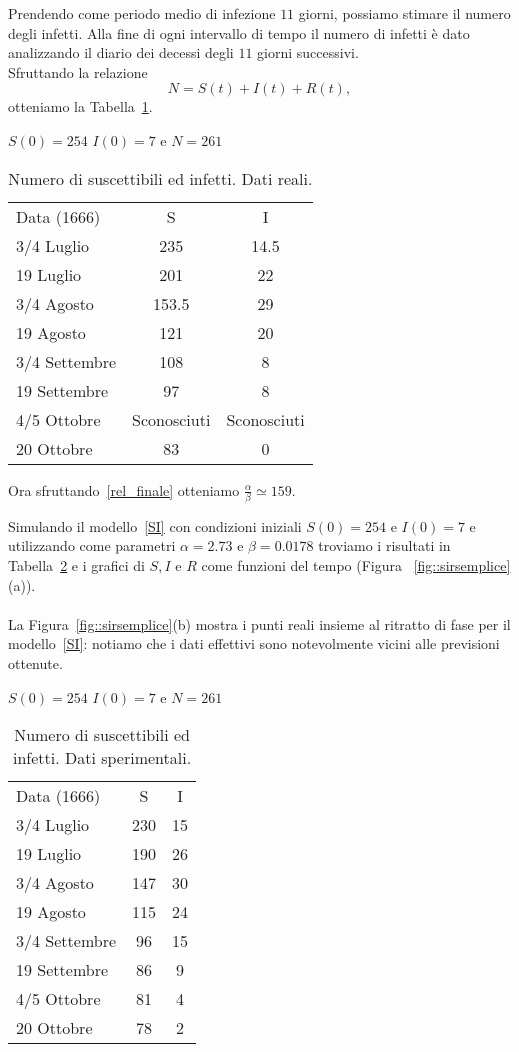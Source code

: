 Prendendo come periodo medio di infezione  $11$ giorni, possiamo stimare il numero degli infetti. Alla fine di ogni intervallo di tempo il numero di infetti \`e dato analizzando il diario dei decessi degli $11$ giorni successivi.\\
Sfruttando la relazione 
$$ N = S(t) + I(t) + R(t),$$ 
otteniamo la Tabella~\ref{table::2}.
\begin{table}[!ht]
\centering
\caption{Numero di suscettibili ed infetti. Dati reali.}

 $S(0) = 254$ $I(0) = 7$ e $N = 261$ 	\\
\label{table::2}
\begin{tabular}{l|c|c}

Data (1666) & S & I\\
\cline{1-3}
3/4 Luglio  & 235& 14.5\\
19 Luglio  & 201 & 22\\
3/4 Agosto  & 153.5& 29\\
19  Agosto  & 121& 20\\
3/4 Settembre  & 108&  8\\
19 Settembre  & 97& 8\\
4/5 Ottobre  & Sconosciuti& Sconosciuti\\
20 Ottobre  & 83& 0\\
 
\end{tabular}
\end{table}

Ora sfruttando~\eqref{rel_finale} otteniamo $\frac{\alpha}{\beta} \simeq 159$.
\newpage

Simulando il modello~\eqref{SI} con condizioni iniziali $S(0) = 254$ e  $I(0)=7$ e utilizzando come parametri $\alpha =2.73 $ e $\beta  = 0.0178 $ troviamo i risultati in Tabella~\ref{table::3} e i grafici di $S,I$ e $R$ come funzioni del tempo (Figura~
\ref{fig::sirsemplice}(a)).\\  \\
La Figura~\ref{fig::sirsemplice}(b) mostra i punti reali insieme al ritratto di fase per il modello~\eqref{SI}: notiamo che i  dati effettivi sono notevolmente vicini alle previsioni ottenute. \begin{table}[ht]
\centering
\caption{Numero di suscettibili ed infetti. Dati sperimentali.}
$S(0) = 254$ $I(0) = 7$ e $N = 261$ \\
\label{table::3}
\begin{tabular}{l|c|c}

Data (1666) & S & I\\
\cline{1-3}
3/4 Luglio  & 230& 15\\
19 Luglio  & 190 & 26\\
3/4 Agosto  & 147& 30\\
19  Agosto  & 115& 24\\
3/4 Settembre  & 96&  15\\
19 Settembre  & 86& 9\\
4/5 Ottobre  & 81& 4\\
20 Ottobre  & 78& 2\\
 
\end{tabular}
\end{table}

